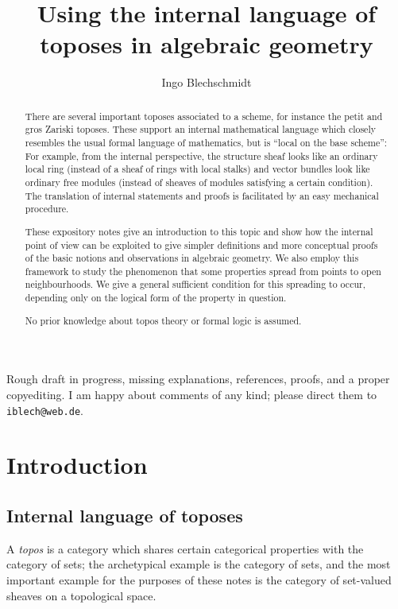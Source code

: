 \documentclass[10pt]{amsart}
\title{Using the internal language of toposes in algebraic geometry}
\author{Ingo Blechschmidt}
\theoremstyle{definition}
\theoremstyle{plain}
\theoremstyle{remark}
\newcommand{\?}{\,{:}\,}
\renewcommand{\_}{\mathpunct{.}\,}
\begin{document}
\begin{abstract}
  There are several important toposes associated to a scheme, for instance the
  petit and gros Zariski toposes. These support an internal mathematical language
  which closely resembles the usual formal language of mathematics, but is ``local
  on the base scheme'':
  For example, from the internal perspective, the structure sheaf looks like an
  ordinary local ring (instead of a sheaf of rings with local stalks) and vector
  bundles look like ordinary free modules (instead of sheaves of modules
  satisfying a certain condition). The translation of internal statements and
  proofs is facilitated by an easy mechanical procedure.

  These expository notes give an introduction to this topic and show how the internal
  point of view can be exploited to give simpler definitions and more conceptual
  proofs of the basic notions and observations in algebraic geometry.
  We also employ this framework to study the phenomenon that some properties
  spread from points to open neighbourhoods. We give a general sufficient
  condition for this spreading to occur, depending only on the logical
  form of the property in question.

  No prior knowledge about topos theory or formal logic is assumed.
\end{abstract}

\maketitle

\begin{center}Rough draft in progress, missing explanations, references,
proofs, and a proper copyediting. I am happy about comments of any
kind; please direct them to \texttt{iblech@web.de}.\end{center}

\tableofcontents

\section{Introduction}

\subsection*{Internal language of toposes}
A \emph{topos} is a category which shares certain categorical properties with
the category of sets; the archetypical example is the category of sets, and
the most important example for the purposes of these notes is the category of
set-valued sheaves on a topological space.
\end{document}

